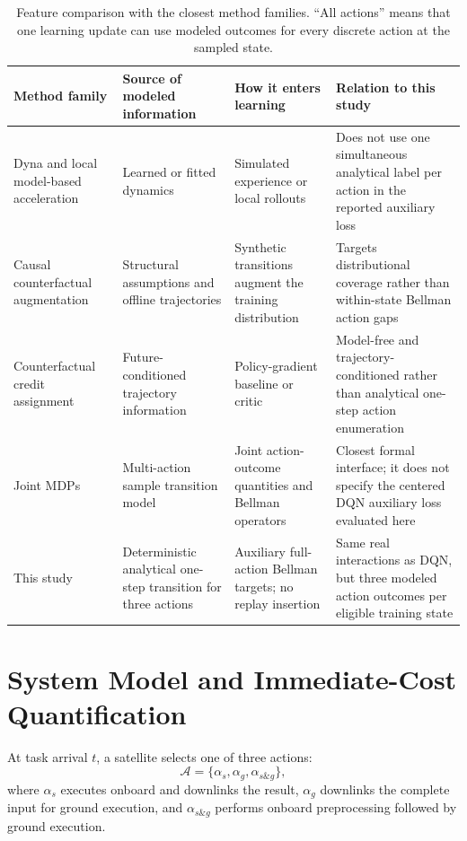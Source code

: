\documentclass[11pt]{article}
\begin{document}
\begin{table}[H]
\centering
\caption{Feature comparison with the closest method families. ``All actions'' means that one learning update can use modeled outcomes for every discrete action at the sampled state.}
\label{tab:closest_methods}
\small
\begin{tabularx}{\textwidth}{lXXX}
\toprule
Method family & Source of modeled information & How it enters learning & Relation to this study \\
\midrule
Dyna and local model-based acceleration~\cite{sutton1991dyna,gu2016continuous} & Learned or fitted dynamics & Simulated experience or local rollouts & Does not use one simultaneous analytical label per action in the reported auxiliary loss \\
Causal counterfactual augmentation~\cite{armengol2024caiac} & Structural assumptions and offline trajectories & Synthetic transitions augment the training distribution & Targets distributional coverage rather than within-state Bellman action gaps \\
Counterfactual credit assignment~\cite{mesnard2021counterfactual} & Future-conditioned trajectory information & Policy-gradient baseline or critic & Model-free and trajectory-conditioned rather than analytical one-step action enumeration \\
Joint MDPs~\cite{kaya2026joint} & Multi-action sample transition model & Joint action-outcome quantities and Bellman operators & Closest formal interface; it does not specify the centered DQN auxiliary loss evaluated here \\
This study & Deterministic analytical one-step transition for three actions & Auxiliary full-action Bellman targets; no replay insertion & Same real interactions as DQN, but three modeled action outcomes per eligible training state \\
\bottomrule
\end{tabularx}
\end{table}
\color{black}%

\section{System Model and Immediate-Cost Quantification}
\label{sec:system}

At task arrival $t$, a satellite selects one of three actions:
\begin{equation}
\mathcal A=\{\alpha_s,\alpha_g,\alpha_{s\&g}\},
\end{equation}
where $\alpha_s$ executes onboard and downlinks the result, $\alpha_g$ downlinks the complete input for ground execution, and $\alpha_{s\&g}$ performs onboard preprocessing followed by ground execution.
\end{document}
